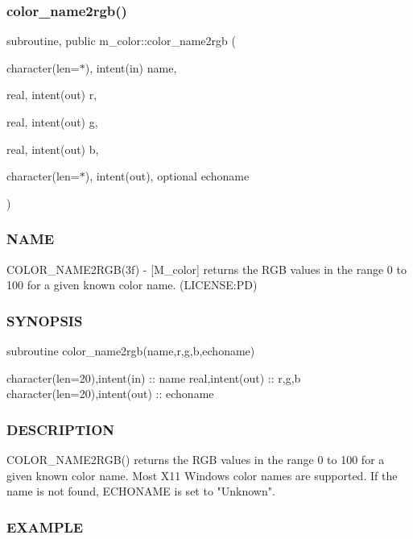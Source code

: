 \subsubsection{\texorpdfstring{color\+\_\+name2rgb()}{color\_name2rgb()}}
{\footnotesize\ttfamily subroutine, public m\+\_\+color\+::color\+\_\+name2rgb (\begin{DoxyParamCaption}\item[{character(len=$\ast$), intent(in)}]{name,  }\item[{real, intent(out)}]{r,  }\item[{real, intent(out)}]{g,  }\item[{real, intent(out)}]{b,  }\item[{character(len=$\ast$), intent(out), optional}]{echoname }\end{DoxyParamCaption})}



\subsubsection*{N\+A\+ME}

C\+O\+L\+O\+R\+\_\+\+N\+A\+M\+E2\+R\+G\+B(3f) -\/ \mbox{[}M\+\_\+color\mbox{]} returns the R\+GB values in the range 0 to 100 for a given known color name. (L\+I\+C\+E\+N\+SE\+:PD) \subsubsection*{S\+Y\+N\+O\+P\+S\+IS}

subroutine color\+\_\+name2rgb(name,r,g,b,echoname)

character(len=20),intent(in) \+:\+: name real,intent(out) \+:\+: r,g,b character(len=20),intent(out) \+:\+: echoname

\subsubsection*{D\+E\+S\+C\+R\+I\+P\+T\+I\+ON}

\begin{DoxyVerb} COLOR_NAME2RGB() returns the RGB values in the range 0 to 100 for a given known color name.
 Most X11 Windows color names are supported. If the name is not found, ECHONAME is set to
 "Unknown".
\end{DoxyVerb}


\subsubsection*{E\+X\+A\+M\+P\+LE}

